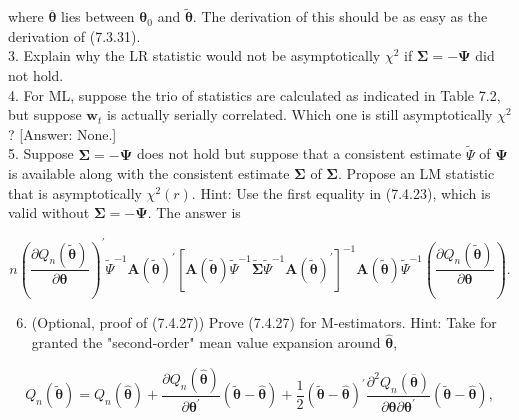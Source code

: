 \documentclass[10pt]{article}
\begin{document}
where $\overline{\boldsymbol{\theta}}$ lies between $\boldsymbol{\theta}_{0}$ and $\tilde{\boldsymbol{\theta}}$. The derivation of this should be as easy as the derivation of (7.3.31).\\
3. Explain why the LR statistic would not be asymptotically $\chi^{2}$ if $\mathbf{\Sigma}=-\mathbf{\Psi}$ did not hold.\\
4. For ML, suppose the trio of statistics are calculated as indicated in Table 7.2, but suppose $\mathbf{w}_{t}$ is actually serially correlated. Which one is still asymptotically $\chi^{2}$ ? [Answer: None.]\\
5. Suppose $\mathbf{\Sigma}=-\mathbf{\Psi}$ does not hold but suppose that a consistent estimate $\widetilde{\Psi}$ of $\mathbf{\Psi}$ is available along with the consistent estimate $\boldsymbol{\Sigma}$ of $\boldsymbol{\Sigma}$. Propose an LM statistic that is asymptotically $\chi^{2}(r)$. Hint: Use the first equality in (7.4.23), which is valid without $\mathbf{\Sigma}=-\mathbf{\Psi}$. The answer is


\begin{equation*}
n\left(\frac{\partial Q_{n}(\tilde{\boldsymbol{\theta}})}{\partial \boldsymbol{\theta}}\right)^{\prime} \widetilde{\Psi}^{-1} \mathbf{A}(\tilde{\boldsymbol{\theta}})^{\prime}\left[\mathbf{A}(\tilde{\boldsymbol{\theta}}) \widetilde{\Psi}^{-1} \widetilde{\boldsymbol{\Sigma}} \widetilde{\Psi}^{-1} \mathbf{A}(\tilde{\boldsymbol{\theta}})^{\prime}\right]^{-1} \mathbf{A}(\tilde{\boldsymbol{\theta}}) \widetilde{\Psi}^{-1}\left(\frac{\partial Q_{n}(\tilde{\boldsymbol{\theta}})}{\partial \boldsymbol{\theta}}\right) . \tag{7.4.31}
\end{equation*}


\begin{enumerate}
  \setcounter{enumi}{5}
  \item (Optional, proof of (7.4.27)) Prove (7.4.27) for M-estimators. Hint: Take for granted the "second-order" mean value expansion around $\hat{\boldsymbol{\theta}}$,
\end{enumerate}


\begin{equation*}
Q_{n}(\tilde{\boldsymbol{\theta}})=Q_{n}(\hat{\boldsymbol{\theta}})+\frac{\partial Q_{n}(\hat{\boldsymbol{\theta}})}{\partial \boldsymbol{\theta}^{\prime}}(\tilde{\boldsymbol{\theta}}-\hat{\boldsymbol{\theta}})+\frac{1}{2}(\tilde{\boldsymbol{\theta}}-\hat{\boldsymbol{\theta}})^{\prime} \frac{\partial^{2} Q_{n}(\overline{\boldsymbol{\theta}})}{\partial \boldsymbol{\theta} \partial \boldsymbol{\theta}^{\prime}}(\tilde{\boldsymbol{\theta}}-\hat{\boldsymbol{\theta}}), \tag{7.4.32}
\end{equation*}
\end{document}
